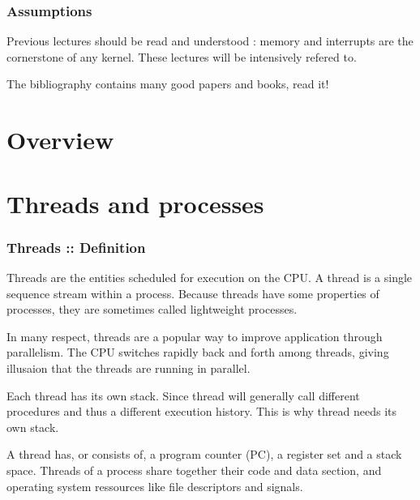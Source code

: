 
\begin{frame}
  \frametitle{Assumptions}

 Previous lectures should be read and understood : memory and interrupts are the cornerstone of any kernel. These lectures will be intensively refered to.

\-

The bibliography contains many good papers and books, read it!

\end{frame}



%
%

\section{Overview}

\section{Threads and processes}


\begin{frame}
  \frametitle{Threads :: Definition}

Threads are the entities scheduled for execution on the CPU. A thread is a single sequence stream within a process. Because threads have some properties of processes, they are sometimes called lightweight processes.

\-

In many respect, threads are a popular way to improve application through parallelism. The CPU switches rapidly back and forth among threads, giving illusaion that the threads are running in parallel.

\-

Each thread has its own stack. Since thread will generally call different procedures and thus a different execution history. This is why thread needs its own stack.

\-

A thread has, or consists of, a program counter (PC), a register set and a stack space. Threads of a process share together their code and data section, and operating system ressources like file descriptors and signals.

\end{frame}


